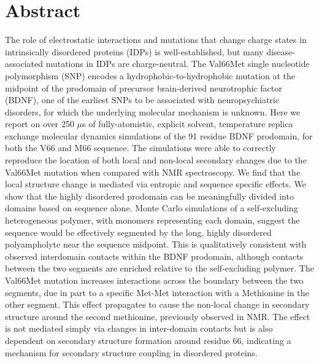 \documentclass[10pt,letterpaper]{article}
\begin{document}
\section*{Abstract}
The role of electrostatic interactions and mutations that change charge states in intrinsically disordered proteins (IDPs) is well-established, but many disease-associated mutations in IDPs are charge-neutral. The Val66Met single nucleotide polymorphism (SNP) encodes a hydrophobic-to-hydrophobic mutation at the midpoint of the prodomain of precursor brain-derived neurotrophic factor (BDNF), one of the earliest SNPs to be associated with neuropsychiatric disorders, for which the underlying molecular mechanism is unknown. Here we report on over 250 $\mu$s of fully-atomistic, explicit solvent, temperature replica exchange molecular dynamics simulations of the 91 residue BDNF prodomain, for both the V66 and M66 sequence.   The simulations were able to correctly reproduce the location of both local and non-local secondary changes due to the Val66Met mutation when compared with NMR spectroscopy. We find that the local structure change is mediated via entropic and sequence specific effects. We show that the highly disordered prodomain can be meaningfully divided into domains based on sequence alone. Monte Carlo simulations of a self-excluding heterogeneous polymer, with monomers representing each domain, suggest the sequence would be effectively segmented by the long, highly disordered polyampholyte near the sequence midpoint. This is qualitatively consistent with observed interdomain contacts within the BDNF prodomain, although contacts between the two segments are enriched relative to the self-excluding polymer. The Val66Met mutation increases interactions across the boundary between the two segments, due in part to a specific Met-Met interaction with a Methionine in the other segment. This effect propagates to cause the non-local change in secondary structure around the second methionine, previously observed in NMR. The effect is not mediated simply via changes in inter-domain contacts but is also dependent on secondary structure formation around residue 66, indicating a mechanism for secondary structure coupling in disordered proteins. 

\end{document}
